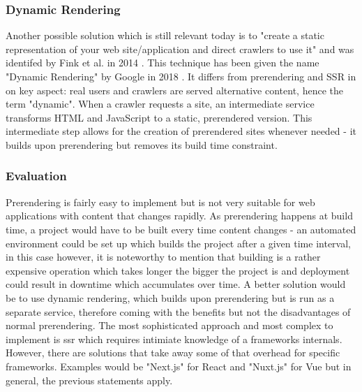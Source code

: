 \subsubsection{Dynamic Rendering}
Another possible solution which is still relevant today is to "create a static representation of your web site/application and direct crawlers to use it" and was identifed by Fink et al. in 2014 \cite[p.~270]{Fink2014:inbook}. This technique has been given the name "Dynamic Rendering" by Google in 2018 \cite{DynamicRenderingGoogle:online}. It differs from prerendering and SSR in on key aspect: real users and crawlers are served alternative content, hence the term "dynamic". When a crawler requests a site, an intermediate service transforms HTML and JavaScript to a static, prerendered version. This intermediate step allows for the creation of prerendered sites whenever needed - it builds upon prerendering but removes its build time constraint.


\subsubsection{Evaluation}
Prerendering is fairly easy to implement but is not very suitable for web applications with content that changes rapidly. As prerendering happens at build time, a project would have to be built every time content changes - an automated environment could be set up which builds the project after a given time interval, in this case however, it is noteworthy to mention that building is a rather expensive operation which takes longer the bigger the project is and deployment could result in downtime which accumulates over time. A better solution would be to use dynamic rendering, which builds upon prerendering but is run as a separate service, therefore coming with the benefits but not the disadvantages of normal prerendering. The most sophisticated approach and most complex to implement is \acrshort{ssr} which requires intimiate knowledge of a frameworks internals. However, there are solutions that take away some of that overhead for specific frameworks. Examples would be "Next.js" for React and "Nuxt.js" for Vue but in general, the previous statements apply. 